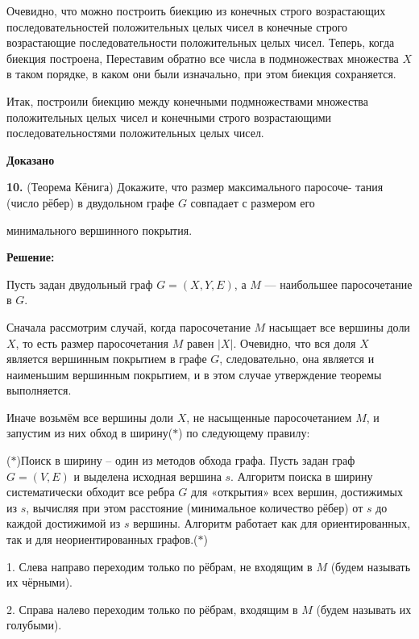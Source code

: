 \documentclass[a4paper,12pt]{article} %
\begin{document}
Очевидно, что можно построить биекцию из конечных строго возрастающих последовательностей положительных целых чисел в конечные строго возрастающие последовательности положительных целых чисел. Теперь, когда биекция построена, Переставим обратно все числа в подмножествах множества $X$ в таком порядке, в каком они были изначально, при этом биекция сохраняется.

Итак, построили биекцию между конечными подмножествами множества положительных целых чисел и конечными строго возрастающими последовательностями положительных целых чисел.


\begin{flushright}
\begin{large}
\textbf {Доказано }
\end{large}
\end{flushright}
\newpage
{\bf 10.} (Теорема Кёнига) Докажите, что размер максимального паросоче-
тания (число рёбер) в двудольном графе $G$ совпадает с размером его

минимального вершинного покрытия.
\begin{center}
\bfseries
{\Large Решение: }
\end{center}

Пусть задан двудольный граф ${\displaystyle G=(X,Y,E)}$, а $M$ — наибольшее паросочетание в $G$.

Сначала рассмотрим случай, когда паросочетание $M$ насыщает все вершины доли $X$, то есть размер паросочетания $M$ равен $|X|$. Очевидно, что вся доля $X$ является вершинным покрытием в графе $G$, следовательно, она является и наименьшим вершинным покрытием, и в этом случае утверждение теоремы выполняется.

Иначе возьмём все вершины доли $X$, не насыщенные паросочетанием $M$, и запустим из них обход в ширину($\ast$) по следующему правилу:


($\ast$)Поиск в ширину -- один из методов обхода графа. Пусть задан граф $G=(V,E)$ и выделена исходная вершина $s$. Алгоритм поиска в ширину систематически обходит все ребра $G$ для «открытия» всех вершин, достижимых из $s$, вычисляя при этом расстояние (минимальное количество рёбер) от $s$ до каждой достижимой из $s$ вершины. Алгоритм работает как для ориентированных, так и для неориентированных графов.($\ast$)


1. Слева направо переходим только по рёбрам, не входящим в $M$ (будем называть их чёрными).

2. Справа налево переходим только по рёбрам, входящим в $M$ (будем называть их голубыми).
\end{document}
